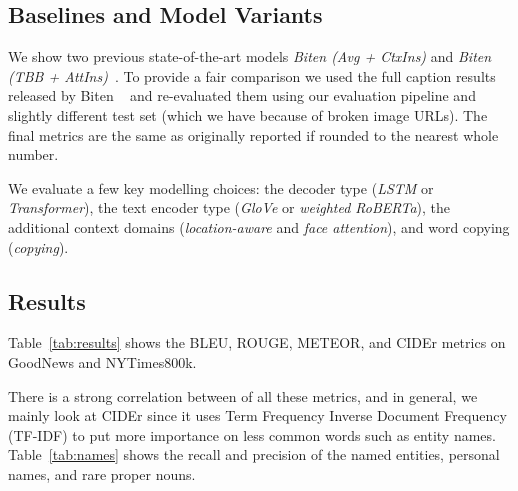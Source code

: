 \subsection{Baselines and Model Variants}

We show two previous state-of-the-art
models \textit{Biten (Avg + CtxIns)} and \textit{Biten (TBB +
	AttIns)}~\cite{Biten2019GoodNews}. To provide a fair comparison we used the
full caption results released by Biten \etal~\cite{Biten2019GoodNews} and
re-evaluated them using our evaluation pipeline and slightly different test set
(which we
have because of
broken image URLs). The final metrics are the same as originally reported if
rounded to the nearest
whole number.

We evaluate a few key modelling choices: the decoder type (\textit{LSTM} or
\textit{Transformer}), the text encoder type (\textit{GloVe} or
\textit{weighted RoBERTa}), the additional context domains
(\textit{location-aware} and \textit{face attention}), and word copying
(\textit{copying}). 


\subsection{Results}


Table~\ref{tab:results} shows the BLEU, ROUGE, METEOR, and CIDEr metrics on
GoodNews and NYTimes800k.


There is a strong correlation between of all these metrics, and in general, we
mainly look at CIDEr since it uses Term Frequency Inverse Document Frequency
(TF-IDF) to put more importance on less common words such as entity names.
Table~\ref{tab:names} shows the recall and precision of the named entities,
personal names, and rare proper nouns.


